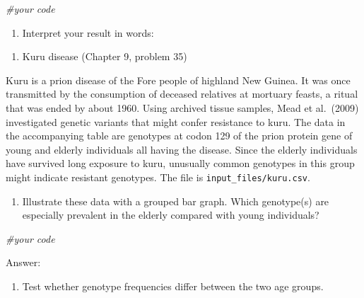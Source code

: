 \documentclass[
]{article}
\newenvironment{Shaded}{\begin{snugshade}}{\end{snugshade}}
\newcommand{\CommentTok}[1]{\textcolor[rgb]{0.56,0.35,0.01}{\textit{#1}}}
\providecommand{\tightlist}{%
  \setlength{\itemsep}{0pt}\setlength{\parskip}{0pt}}
\begin{document}
\begin{Shaded}
\begin{Highlighting}[]
\CommentTok{\#your code}
\end{Highlighting}
\end{Shaded}

\begin{enumerate}
\def\labelenumi{\Alph{enumi})}
\setcounter{enumi}{2}
\tightlist
\item
  Interpret your result in words:
\end{enumerate}

\begin{enumerate}
\def\labelenumi{\arabic{enumi}.}
\setcounter{enumi}{1}
\tightlist
\item
  Kuru disease (Chapter 9, problem 35)
\end{enumerate}

Kuru is a prion disease of the Fore people of highland New Guinea. It
was once transmitted by the consumption of deceased relatives at
mortuary feasts, a ritual that was ended by about 1960. Using archived
tissue samples, Mead et al.~(2009) investigated genetic variants that
might confer resistance to kuru. The data in the accompanying table are
genotypes at codon 129 of the prion protein gene of young and elderly
individuals all having the disease. Since the elderly individuals have
survived long exposure to kuru, unusually common genotypes in this group
might indicate resistant genotypes. The file is
\texttt{input\_files/kuru.csv}.

\begin{enumerate}
\def\labelenumi{\Alph{enumi})}
\tightlist
\item
  Illustrate these data with a grouped bar graph. Which genotype(s) are
  especially prevalent in the elderly compared with young individuals?
\end{enumerate}

\begin{Shaded}
\begin{Highlighting}[]
\CommentTok{\#your code}
\end{Highlighting}
\end{Shaded}

Answer:

\begin{enumerate}
\def\labelenumi{\Alph{enumi})}
\setcounter{enumi}{1}
\tightlist
\item
  Test whether genotype frequencies differ between the two age groups.
\end{enumerate}
\end{document}
